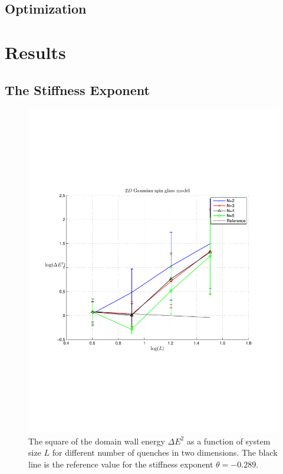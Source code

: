 \documentclass[paper=a4, fontsize=11pt]{scrartcl} %
\numberwithin{equation}{section} %
\numberwithin{figure}{section} %
\numberwithin{table}{section} %
\begin{document}
\subsection{Optimization}

\section{Results}
\label{sec:results}

\subsection{The Stiffness Exponent}

\begin{figure}
\centering
\includegraphics[width=\textwidth]{images/spinglass2D.pdf}
\caption{The square of the domain wall energy $\Delta E ^ 2$ as a function of system size $L$ for different number of quenches in two dimensions. The black line is the reference value for the stiffness exponent $\theta=-0.289$.}
\label{fig:E_2D}
\end{figure}
\end{document}
